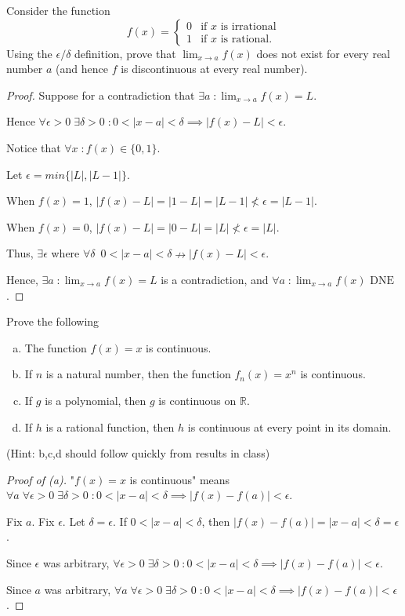 \documentclass{article} %
\theoremstyle{plain}
\theoremstyle{definition}
\newcommand{\Rb}{\mathbb{R}}
\begin{document}
\noindent{} Consider the function 
$$f(x) = \begin{cases} 0 & \text{if $x$ is irrational} \\
1 & \text{if $x$ is rational.}
\end{cases}
$$
Using the $\epsilon/\delta$ definition, prove that $\lim_{x \rightarrow a} f(x)$ does not exist for every real number $a$ (and hence $f$ is discontinuous at every real number). 

\begin{proof}
    Suppose for a contradiction that $\exists a \; \colon \lim_{x \to a} f(x) = L$. 
    
    Hence $\forall \epsilon > 0 \; \exists \delta > 0 \; \colon 0 < |x-a| < \delta \implies |f(x) - L| < \epsilon$.
    
    Notice that $\forall x \; \colon f(x) \in \{0, 1\}$.

    Let $\epsilon = min\{|L|, |L-1|\}$.

    When $f(x) = 1$, $|f(x)-L| = |1-L| = |L-1| \nless \epsilon = |L-1|$.

    When $f(x) = 0$, $|f(x)-L| = |0-L| = |L| \nless \epsilon = |L|$.

    Thus, $\exists \epsilon$ where $\forall \delta \; \: 0 < |x-a| < \delta \nrightarrow |f(x)-L| < \epsilon$.

    Hence, $\exists a \; \colon \lim_{x \to a} f(x) = L$ is a contradiction, and $\forall a \; \colon \lim_{x \to a} f(x) \text{ DNE}$.

\end{proof} 



\noindent{} Prove the following
\begin{enumerate}[(a)]
\item The function $f(x) = x$ is continuous.
\item If $n$ is a natural number, then the function $f_n(x) = x^n$ is continuous. 
\item If $g$ is a polynomial, then $g$ is continuous on $\Rb$.
\item If $h$ is a rational function, then $h$ is continuous at every point in its domain. 
\end{enumerate}

(Hint: b,c,d should follow quickly from results in class) 

\begin{proof}[Proof of (a)] 
    "$f(x) = x$ is continuous" means $\forall a \; \forall \epsilon > 0 \; \exists \delta > 0\; \colon 0 < |x-a| < \delta \implies |f(x) - f(a)| < \epsilon$.

    Fix $a$. Fix $\epsilon$. Let $\delta = \epsilon$.  If $0 < |x-a| < \delta$, then $|f(x) - f(a)| = |x-a| < \delta = \epsilon$.

    Since $\epsilon$ was arbitrary, $\forall \epsilon > 0 \; \exists \delta > 0 \; \colon 0 < |x-a| < \delta \implies |f(x) - f(a)| < \epsilon$.

    Since $a$ was arbitrary, $\forall a \; \forall \epsilon > 0 \; \exists \delta > 0 \; \colon 0 < |x-a| < \delta \implies |f(x) - f(a)| < \epsilon$.

\end{proof} 
\end{document}

